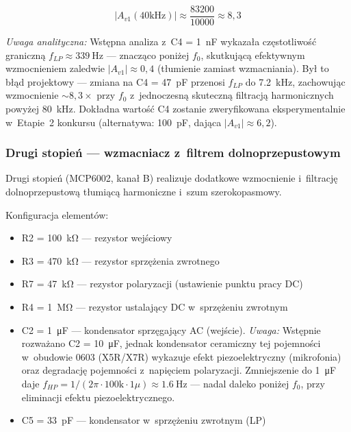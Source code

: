 \documentclass[a4paper,11pt]{article}
\begin{document}
\begin{equation}
    |A_{v1}(40\text{kHz})| \approx \frac{83200}{10000} \approx 8{,}3
    \label{eq:gain1_actual}
\end{equation}

\textit{Uwaga analityczna:} Wstępna analiza z~C4 = \SI{1}{\nano\farad}
wykazała częstotliwość graniczną $f_{LP} \approx \SI{339}{\hertz}$ --- znacząco
poniżej $f_0$, skutkującą efektywnym wzmocnieniem zaledwie $|A_{v1}| \approx 0{,}4$
(tłumienie zamiast wzmacniania). Był to błąd projektowy --- zmiana na
C4 = \SI{47}{\pico\farad} przenosi $f_{LP}$ do \SI{7,2}{\kilo\hertz}, zachowując
wzmocnienie ${\sim}8{,}3\times$ przy $f_0$ z~jednoczesną skuteczną filtracją
harmonicznych powyżej \SI{80}{\kilo\hertz}. Dokładna wartość C4 zostanie
zweryfikowana eksperymentalnie w~Etapie~2 konkursu (alternatywa: \SI{100}{\pico\farad},
dająca $|A_{v1}| \approx 6{,}2$).

\subsubsection{Drugi stopień --- wzmacniacz z~filtrem dolnoprzepustowym}

Drugi stopień (MCP6002, kanał B) realizuje dodatkowe wzmocnienie
i~filtrację dolnoprzepustową tłumiącą harmoniczne i~szum szerokopasmowy.

Konfiguracja elementów:
\begin{itemize}[nosep]
    \item R2 = \SI{100}{\kilo\ohm} --- rezystor wejściowy
    \item R3 = \SI{470}{\kilo\ohm} --- rezystor sprzężenia zwrotnego
    \item R7 = \SI{47}{\kilo\ohm} --- rezystor polaryzacji (ustawienie punktu pracy DC)
    \item R4 = \SI{1}{\mega\ohm} --- rezystor ustalający DC w~sprzężeniu zwrotnym
    \item C2 = \SI{1}{\micro\farad} --- kondensator sprzęgający AC (wejście).
          \textit{Uwaga:} Wstępnie rozważano C2 = \SI{10}{\micro\farad}, jednak
          kondensator ceramiczny tej pojemności w~obudowie 0603 (X5R/X7R) wykazuje
          efekt piezoelektryczny (mikrofonia) oraz degradację pojemności z~napięciem
          polaryzacji. Zmniejszenie do \SI{1}{\micro\farad} daje
          $f_{HP} = 1/(2\pi \cdot 100\text{k} \cdot 1\mu) \approx \SI{1,6}{\hertz}$
          --- nadal daleko poniżej $f_0$, przy eliminacji efektu piezoelektrycznego.
    \item C5 = \SI{33}{\pico\farad} --- kondensator w~sprzężeniu zwrotnym (LP)
\end{itemize}
\end{document}
